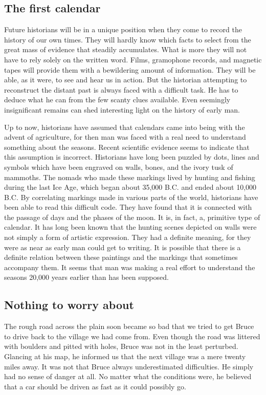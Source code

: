 \documentclass[11pt]{article}
\begin{document}
\subsection{The first calendar}
\label{sec-1-38}

Future historians will be in a unique position when they come to record the history of our own times. They will hardly know which facts to select from the great mass of evidence that steadily accumulates. What is more they will not have to rely solely on the written word. Films, gramophone records, and magnetic tapes will provide them with a bewildering amount of information. They will be able, as it were, to see and hear us in action. But the historian attempting to reconstruct the distant past is always faced with a difficult task. He has to deduce what he can from the few scanty clues available. Even seemingly insignificant remains can shed interesting light on the history of early man. 

Up to now, historians have assumed that calendars came into being with the advent of agriculture, for then man was faced with a real need to understand something about the seasons. Recent scientific evidence seems to indicate that this assumption is incorrect. Historians have long been puzzled by dots, lines and symbols which have been engraved on walls, bones, and the ivory tusk of mammoths. The nomads who made these markings lived by hunting and fishing during the last Ice Age, which began about 35,000 B.C. and ended about 10,000 B.C. By correlating markings made in various parts of the world, historians have been able to read this difficult code. They have found that it is connected with the passage of days and the phases of the moon. It is, in fact, a, primitive type of calendar. It has long been known that the hunting scenes depicted on walls were not simply a form of artistic expression. They had a definite meaning, for they were as near as early man could get to writing. It is possible that there is a definite relation between these paintings and the markings that sometimes accompany them. It seems that man was making a real effort to understand the seasons 20,000 years earlier than has been supposed.
\subsection{Nothing to worry about}
\label{sec-1-39}

The rough road across the plain soon became so bad that we tried to get Bruce to drive back to the village we had come from. Even though the road was littered with boulders and pitted with holes, Bruce was not in the least perturbed. Glancing at his map, he informed us that the next village was a mere twenty miles away. It was not that Bruce always underestimated difficulties. He simply had no sense of danger at all. No matter what the conditions were, he believed that a car should be driven as fast as it could possibly go.
\end{document}
